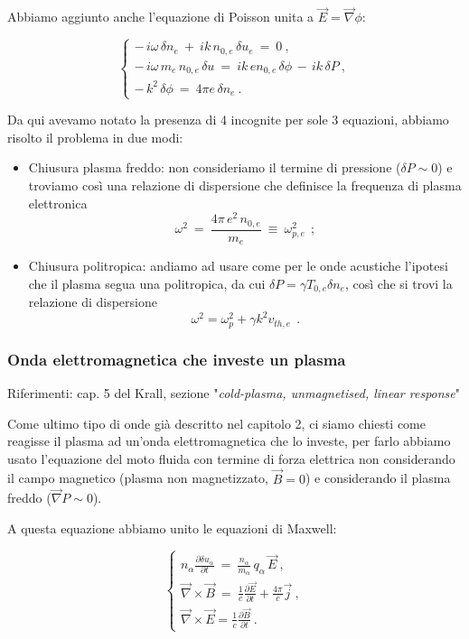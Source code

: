 Abbiamo aggiunto anche l'equazione di Poisson unita a $\vec E=\vec \nabla \phi$:

\[\begin{cases}
	-\, i\omega\,\delta n_e\ +\ i k\, n_{0, e}\,\delta u_e\ =\ 0\ , \\
	-\, i\omega\, m_e\, n_{0, e}\, \delta u\ =\ ik\, e n_{0, e}\, \delta \phi\, -\, ik\,\delta P\ , \\
	-\,k^2\, \delta \phi\ =\ 4\pi e\, \delta n_e\ .
\end{cases}\]

Da qui avevamo notato la presenza di 4 incognite per sole 3 equazioni, abbiamo risolto il problema in due modi:
\begin{itemize}
	\item Chiusura plasma freddo: non consideriamo il termine di pressione ($\delta P\sim 0$) e troviamo così una relazione di dispersione che definisce la frequenza di plasma elettronica 
	\begin{equation}
		\label{onde di plasma freddo}
		\omega^2\ =\ \frac{4\pi\, e^2\, n_{0, e}}{m_e} \ \equiv\  \omega^2_{p,e}\ \ ;
	\end{equation}
	\item Chiusura politropica: andiamo ad usare come per le onde acustiche l'ipotesi che il plasma segua una politropica, da cui $\delta P=\gamma T_{0,e}\delta n_e $, così che si trovi la relazione di dispersione
	\[\omega^2=\omega^2_p+\gamma k^2v_{th,e}\ \ .\]
\end{itemize}

%
%
\subsubsection{Onda elettromagnetica che investe un plasma}

\epigraph{
	Riferimenti: cap. 5 del Krall, sezione "\emph{cold-plasma, unmagnetised, linear response}"
}{}

Come ultimo tipo di onde già descritto nel capitolo 2, ci siamo chiesti come reagisse il plasma ad un'onda elettromagnetica che lo investe, per farlo abbiamo usato l'equazione del moto fluida con termine di forza elettrica non considerando il campo magnetico (plasma non magnetizzato, $\vec B=0$) e considerando il plasma freddo ($\vec \nabla P\sim 0$). 

A questa equazione abbiamo unito le equazioni di Maxwell:

\[\begin{cases}
	n_\alpha \frac{\partial \delta u_\alpha}{\partial t}\ =\ \frac{n_\alpha}{m_\alpha}\, q_\alpha\, \vec E\ ,\\
	\vec \nabla \times \vec B \ =\ \frac{1}{c}\frac{\partial \vec E}{\partial t} + \frac{4\pi}{c}\vec j\ ,\\
	\vec \nabla \times \vec E = \frac{1}{c}\frac{\partial \vec B}{\partial t}\ .
\end{cases}\]

